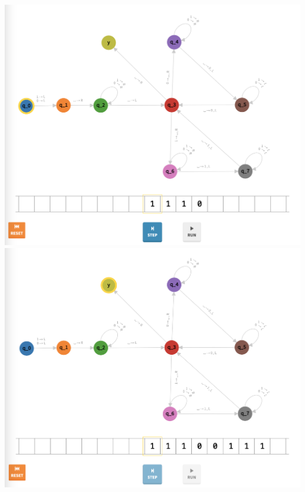 \documentclass[a4paper]{article}
\begin{document}
\begin{center}
\includegraphics[width=\textwidth]{TM2.5}
\includegraphics[width=\textwidth]{TM2.6}
\end{center}
\newpage
\end{document}
